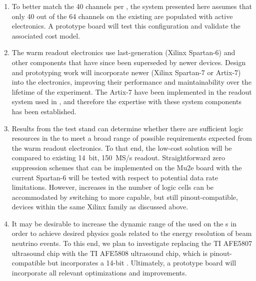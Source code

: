 \begin{enumerate}
\item To better match the 40  channels per , the system presented here assumes that only 40 out of the 64 channels on the existing    are populated with active electronics.  A prototype board will test this configuration and validate the associated cost model.

\item The   warm readout electronics use last-generation (Xilinx\texttrademark{} Spartan-6)  and other components that have since been superseded by newer devices.  Design and prototyping work will 
incorporate newer  (Xilinx Spartan-7 or Artix-7) into the electronics,
improving their performance and maintainability over the lifetime of the  experiment. The Artix-7  have been implemented in the  readout system used in , and therefore the expertise with these system components has been established. 

\item Results from the   test stand can determine whether there are sufficient logic resources in the  to meet a broad range of possible  requirements expected from the warm readout electronics. To that end, the low-cost  solution will be compared to existing \SI{14}{bit}, \SI{150}{MS/s}  readout.  Straightforward zero suppression schemes that can be implemented on the Mu2e board with the current Spartan-6  will be tested with respect to potential  data rate limitations.  However, increases in the number of logic cells can be accommodated by switching to more capable, but still pinout-compatible, devices within the same Xilinx  family as discussed above.

\item It may be desirable to increase the dynamic range of the  used on the s in order to achieve desired physics goals related to the energy resolution of beam neutrino events.  To this end, we plan to investigate replacing the TI AFE5807 ultrasound chip with the TI AFE5808 ultrasound chip, which is pinout-compatible but incorporates a 14-bit .  Ultimately, a prototype board will incorporate all relevant optimizations and improvements.

\end{enumerate}

